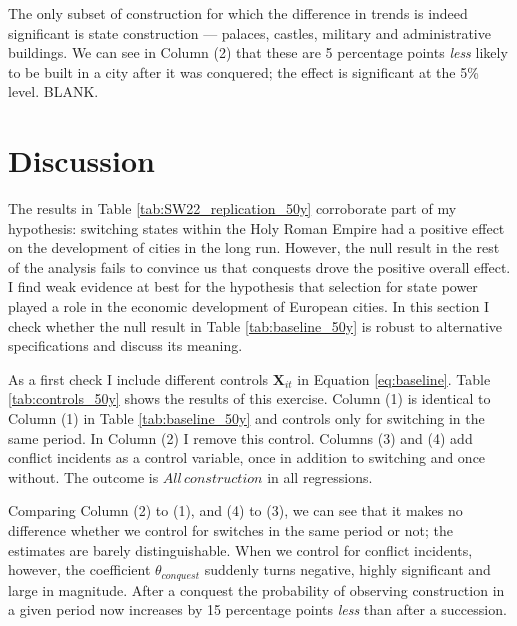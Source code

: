 \documentclass[11pt, a4paper]{article}
\begin{document}
The only subset of construction for which the difference in trends is indeed significant is state construction --- palaces, castles, military and administrative buildings. We can see in Column (2) that these are 5 percentage points \textit{less} likely to be built in a city after it was conquered; the effect is significant at the 5\% level. BLANK.



\section{Discussion} \label{sec:discussion}

The results in Table \ref{tab:SW22_replication_50y} corroborate part of my hypothesis: switching states within the Holy Roman Empire had a positive effect on the development of cities in the long run. However, the null result in the rest of the analysis fails to convince us that conquests drove the positive overall effect. I find weak evidence at best for the hypothesis that selection for state power played a role in the economic development of European cities. In this section I check whether the null result in Table \ref{tab:baseline_50y} is robust to alternative specifications and discuss its meaning.

As a first check I include different controls $\textbf{X}_{it}$ in Equation \eqref{eq:baseline}. Table \ref{tab:controls_50y} shows the results of this exercise. Column (1) is identical to Column (1) in Table \ref{tab:baseline_50y} and controls only for switching in the same period. In Column (2) I remove this control. Columns (3) and (4) add conflict incidents as a control variable, once in addition to switching and once without. The outcome is $All \, construction$ in all regressions. 

Comparing Column (2) to (1), and (4) to (3), we can see that it makes no difference whether we control for switches in the same period or not; the estimates are barely distinguishable. When we control for conflict incidents, however, the coefficient $\theta_{conquest}$ suddenly turns negative, highly significant and large in magnitude. After a conquest the probability of observing construction in a given period now increases by 15 percentage points \textit{less} than after a succession.
\end{document}
